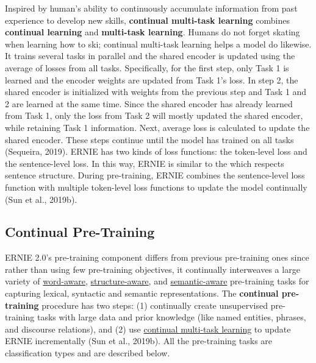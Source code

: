 Inspired by human's ability to continuously accumulate information from past experience to develop new skills, \textbf{continual multi-task learning}  combines \textbf{continual learning} and \textbf{multi-task learning}. Humans do not forget skating when learning how to ski; continual multi-task learning helps a model do likewise. It trains several tasks in parallel and the shared encoder is updated using the average of losses from all tasks. Specifically, for the first step, only Task 1 is learned and the encoder weights are updated from Task 1's loss. In step 2, the shared encoder is initialized with weights from the previous step and Task 1 and 2 are learned at the same time. Since the shared encoder has already learned from Task 1, only the loss from Task 2 will mostly updated the shared encoder, while retaining Task 1 information. Next, average loss is calculated to update the shared encoder. These steps continue until the model has trained on all tasks (Sequeira, 2019). ERNIE has two kinds of loss functions: the token-level loss and the sentence-level loss. In this way, ERNIE is similar to the  which respects sentence structure. During pre-training, ERNIE combines the sentence-level loss function with multiple token-level loss functions to update the model continually (Sun et al., 2019b). 





\subsection{Continual Pre-Training}\label{sec:ContinualPreTraining}

ERNIE 2.0's pre-training component differs from previous pre-training ones since rather than using few pre-training objectives, it continually interweaves a large variety of \hyperref[sec:WordAwarePretrainingTask]{word-aware}, \hyperref[sec:StructureAwarePretrainingTask]{structure-aware}, and \hyperref[sec:SemanticAwarePretrainingTask]{semantic-aware} pre-training tasks for capturing lexical, syntactic and semantic representations. The \textbf{continual pre-training} procedure has two steps: (1) continually create unsupervised pre-training tasks with large data and prior knowledge (like named entities, phrases, and discourse relations), and (2) use \hyperref[sec:ContinualMultiTaskLearning]{continual multi-task learning} to update ERNIE incrementally (Sun et al., 2019b). All the pre-training tasks are classification types and are described below. 

